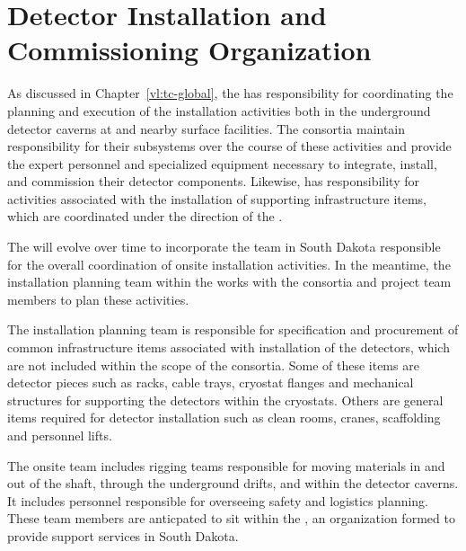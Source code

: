 \chapter{Detector Installation and Commissioning Organization}
\label{ch:tc-jpo}


As discussed in Chapter~\ref{vl:tc-global}, the  has
responsibility for coordinating the planning and execution of 
the  installation activities both 
in the underground detector caverns at  and 
nearby surface facilities.  The  consortia maintain 
responsibility for their subsystems over the course of these 
activities and provide the expert personnel and specialized 
equipment necessary to integrate, install, and commission their 
detector components.  Likewise,  has responsibility 
for activities associated with the installation 
of supporting infrastructure items, which are coordinated under 
the direction of the .       

The   will evolve over 
time to incorporate the team in South Dakota responsible for the 
overall coordination of onsite installation activities.  In the 
meantime, the installation planning team within the  works with 
the  consortia and  project team members 
to plan these activities.  

The  installation planning team is responsible for specification 
and procurement of common infrastructure items associated with 
installation of the detectors, which are not included within 
the scope of the  consortia.  Some of these items 
are detector pieces such as racks, cable trays, cryostat flanges 
and mechanical structures for supporting the detectors within 
the cryostats.  Others are general items required for detector 
installation such as clean rooms, cranes, scaffolding and 
personnel lifts.

The onsite  team includes rigging teams responsible for moving 
materials in and out of the shaft, through the underground drifts, 
and within the detector caverns.  It includes personnel responsible 
for overseeing safety and logistics planning.  These team members 
are anticpated to sit within the , an organization 
formed to provide  support services in South Dakota.    

